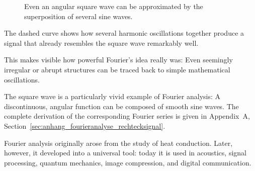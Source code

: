 \FloatBarrier
\begin{figure}[H]
	\centering
	\caption{Even an angular square wave can be approximated by the superposition of several sine waves.}
	\label{fig:rechteck-fourier}
\end{figure}

The dashed curve shows
how several harmonic oscillations together
produce a signal
that already resembles the square wave remarkably well.

This makes visible
how powerful Fourier's idea really was:
Even seemingly irregular or abrupt structures
can be traced back to simple mathematical oscillations.
\newpage
\noindent
\begin{NoteBox}
	\small
	\label{box:fourier-vertiefung-rechtecksignal}
	The square wave is a particularly vivid example of Fourier analysis:
	A discontinuous, angular function can be composed of smooth sine waves.
	The complete derivation of the corresponding Fourier series is given in
	Appendix~A, Section~\ref{sec:anhang_fourieranalyse_rechtecksignal}.
\end{NoteBox}

Fourier analysis originally arose from the study of heat conduction.
Later, however, it developed into a universal tool:
today it is used in acoustics, signal processing, quantum mechanics,
image compression, and digital communication.

